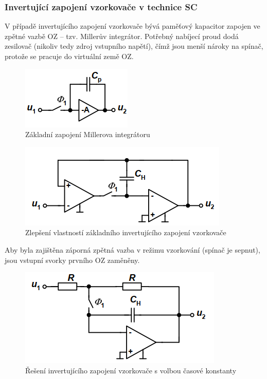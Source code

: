 \subsubsection{Invertující zapojení vzorkovače v technice SC}
V případě invertujícího zapojení vzorkovače bývá paměťový kapacitor zapojen ve zpětné vazbě OZ – tzv. Millerův integrátor. Potřebný nabíjecí proud dodá zesilovač (nikoliv tedy zdroj vstupního napětí), čímž jsou menší nároky na spínač, protože se pracuje do virtuální země OZ.
\begin{figure}[h]
   \begin{center}
     \includegraphics[scale=0.6]{images/Miller.png}
   \end{center}
   \caption{Základní zapojení Millerova integrátoru}
\end{figure} 
\newpage
\begin{figure}[t]
   \begin{center}
     \includegraphics[scale=0.6]{images/VzorSC4.png}
   \end{center}
   \caption{Zlepšení vlastností základního invertujícího zapojení vzorkovače}
\end{figure}
Aby byla zajištěna záporná zpětná vazba v režimu vzorkování (spínač je sepnut), jsou
vstupní svorky prvního OZ zaměněny.
\begin{figure}[h]
   \begin{center}
     \includegraphics[scale=0.6]{images/VzorSC5.png}
   \end{center}
   \caption{Řešení invertujícího zapojení vzorkovače s volbou časové konstanty}
\end{figure}

